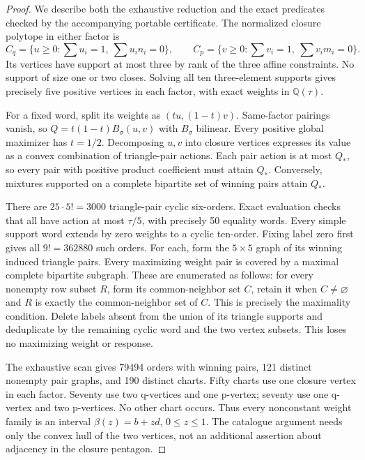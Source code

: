 \begin{proof}
We describe both the exhaustive reduction and the exact predicates checked
by the accompanying portable certificate.
The normalized closure polytope in either factor is
\[
 C_q=\{u\geq0:\sum u_i=1,\ \sum u_in_i=0\},\qquad
 C_p=\{v\geq0:\sum v_i=1,\ \sum v_im_i=0\}.
\]
Its vertices have support at most three by rank of the three affine
constraints. No support of size one or two closes. Solving all ten
three-element supports gives precisely five positive vertices in each
factor, with exact weights in $\mathbb Q(\tau)$.

For a fixed word, split its weights as $(tu,(1-t)v)$. Same-factor pairings
vanish, so $Q=t(1-t)B_\sigma(u,v)$ with $B_\sigma$ bilinear.
Every positive global maximizer has $t=1/2$. Decomposing $u,v$ into closure
vertices expresses its value as a convex combination of triangle-pair
actions. Each pair action is at most $Q_*$, so every pair with positive
product coefficient must attain $Q_*$. Conversely, mixtures supported on
a complete bipartite set of winning pairs attain $Q_*$.

There are $25\cdot5!=3000$ triangle-pair cyclic six-orders. Exact evaluation
checks that all have action at most $\tau/5$, with precisely 50 equality
words. Every simple support word extends by zero weights to a cyclic
ten-order. Fixing label zero first gives all $9!=362880$ such orders.
For each, form the $5\times5$ graph of its winning induced triangle pairs.
Every maximizing weight pair is covered by a maximal complete bipartite
subgraph. These are enumerated as follows: for every nonempty row subset
$R$, form its common-neighbor set $C$, retain it when $C\ne\varnothing$
and $R$ is exactly the common-neighbor set of $C$. This is precisely the
maximality condition. Delete labels absent from the union of its triangle
supports and deduplicate by the remaining cyclic word and the two vertex
subsets. This loses no maximizing weight or response.

The exhaustive scan gives 79494 orders with winning pairs, 121 distinct
nonempty pair graphs, and 190 distinct charts. Fifty charts use one closure
vertex in each factor. Seventy use two q-vertices and one p-vertex; seventy
use one q-vertex and two p-vertices. No other chart occurs. Thus every
nonconstant weight family is an interval $\beta(z)=b+zd$, $0\leq z\leq1$.
The catalogue argument needs only the convex hull of the two vertices,
not an additional assertion about adjacency in the closure pentagon.


\end{proof}
